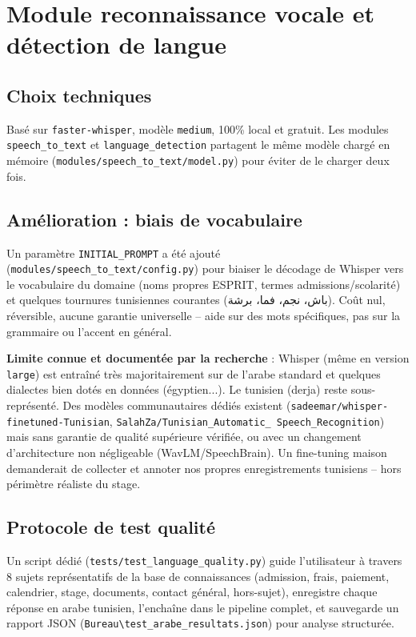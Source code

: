 \documentclass[11pt,a4paper]{report}
\begin{document}
\chapter{Module reconnaissance vocale et détection de langue}

\section{Choix techniques}
Basé sur \texttt{faster-whisper}, modèle \texttt{medium}, 100\% local et gratuit. Les
modules \texttt{speech\_to\_text} et \texttt{language\_detection} partagent le même
modèle chargé en mémoire (\texttt{modules/speech\_to\_text/model.py}) pour éviter de le
charger deux fois.

\section{Amélioration : biais de vocabulaire}
Un paramètre \texttt{INITIAL\_PROMPT} a été ajouté
(\texttt{modules/speech\_to\_text/config.py}) pour biaiser le décodage de Whisper vers le
vocabulaire du domaine (noms propres ESPRIT, termes admissions/scolarité) et quelques
tournures tunisiennes courantes (باش، نجم، فما، برشة). Coût nul, réversible, aucune
garantie universelle -- aide sur des mots spécifiques, pas sur la grammaire ou l'accent
en général.

\begin{statutlimite}
\textbf{Limite connue et documentée par la recherche} : Whisper (même en version
\texttt{large}) est entraîné très majoritairement sur de l'arabe standard et quelques
dialectes bien dotés en données (égyptien...). Le tunisien (derja) reste
sous-représenté. Des modèles communautaires dédiés existent
(\texttt{sadeemar/whisper-finetuned-Tunisian}, \texttt{SalahZa/Tunisian\_Automatic\_
Speech\_Recognition}) mais sans garantie de qualité supérieure vérifiée, ou avec un
changement d'architecture non négligeable (WavLM/SpeechBrain). Un fine-tuning maison
demanderait de collecter et annoter nos propres enregistrements tunisiens -- hors
périmètre réaliste du stage.
\end{statutlimite}

\section{Protocole de test qualité}
Un script dédié (\texttt{tests/test\_language\_quality.py}) guide l'utilisateur à travers
8 sujets représentatifs de la base de connaissances (admission, frais, paiement,
calendrier, stage, documents, contact général, hors-sujet), enregistre chaque réponse en
arabe tunisien, l'enchaîne dans le pipeline complet, et sauvegarde un rapport JSON
(\texttt{Bureau\textbackslash test\_arabe\_resultats.json}) pour analyse structurée.
\end{document}
